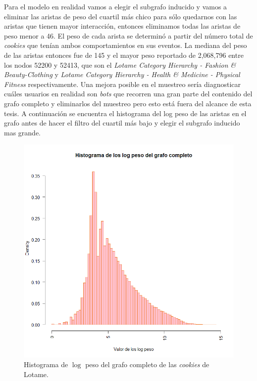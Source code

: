 Para el modelo en realidad vamos a elegir el subgrafo inducido y vamos a eliminar las aristas de peso del cuartil más chico para sólo quedarnos con las aristas que tienen mayor interacción, entonces eliminamos todas las aristas de peso menor a 46. El peso de cada arista se determinó a partir del número total de \textit{cookies} que tenían ambos comportamientos en sus eventos. La mediana del peso de las aristas entonces fue de 145 y el mayor peso reportado de 2,068,796 entre los nodos 52200 y 52413, que son el \textit{Lotame Category Hierarchy - Fashion & Beauty-Clothing} y \textit{Lotame Category Hierarchy - Health & Medicine - Physical Fitness} respectivamente. Una mejora posible en el muestreo sería diagnosticar cuáles usuarios en realidad son \textit{bots} que recorren una gran parte del contenido del grafo completo y eliminarlos del muestreo pero esto está fuera del alcance de esta tesis. A continuación se encuentra el histograma del log peso de las aristas en el grafo antes de hacer el filtro del cuartil más bajo y elegir el subgrafo inducido mas grande.

\begin{figure}[!ht]
\includegraphics[width=1\textwidth]{Tesis/Figures/HistGrafoCompleto.png}
\caption{Histograma de $\log$ peso del grafo completo de las \textit{cookies} de Lotame.}
\centering
\end{figure}

